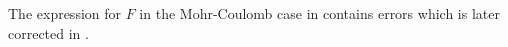 \begin{remark}
The expression for $F$ in the Mohr-Coulomb case in \cite{zico74} contains errors
which is later corrected in \cite[p102]{book_zitf}. 
\end{remark}









%


\newpage
